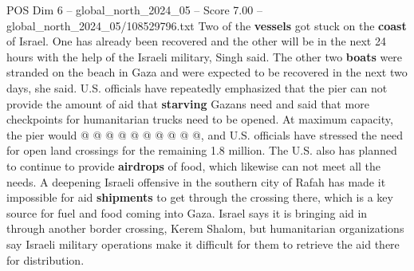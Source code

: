 \begin{textsample}{POS Dim 6 – global\_north\_2024\_05 – Score 7.00 – global\_north\_2024\_05/108529796.txt}
Two of the \textbf{vessels} got stuck on the \textbf{coast} of Israel.
One has already been recovered and the other will be in the next 24 hours with the help of the Israeli military, Singh said.
The other two \textbf{boats} were stranded on the beach in Gaza and were expected to be recovered in the next two days, she said.
U.S. officials have repeatedly emphasized that the pier can not provide the amount of aid that \textbf{starving} Gazans need and said that more checkpoints for humanitarian trucks need to be opened.
At maximum capacity, the pier would @ @ @ @ @ @ @ @ @ @, and U.S. officials have stressed the need for open land crossings for the remaining 1.8 million.
The U.S. also has planned to continue to provide \textbf{airdrops} of food, which likewise can not meet all the needs.
A deepening Israeli offensive in the southern city of Rafah has made it impossible for aid \textbf{shipments} to get through the crossing there, which is a key source for fuel and food coming into Gaza.
Israel says it is bringing aid in through another border crossing, Kerem Shalom, but humanitarian organizations say Israeli military operations make it difficult for them to retrieve the aid there for distribution.

\end{textsample}

